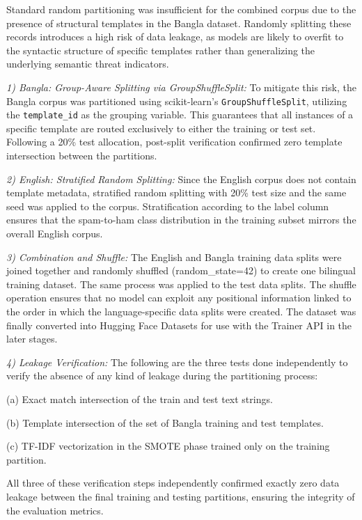 \documentclass[journal]{IEEEtran}
\begin{document}
Standard random partitioning was insufficient for the combined corpus due to the presence of structural templates in the Bangla dataset. Randomly splitting these records introduces a high risk of data leakage, as models are likely to overfit to the syntactic structure of specific templates rather than generalizing the underlying semantic threat indicators.

\textit{1) Bangla: Group-Aware Splitting via GroupShuffleSplit:} To mitigate this risk, the Bangla corpus was partitioned using scikit-learn's \texttt{GroupShuffleSplit}, utilizing the \texttt{template\_id} as the grouping variable. This guarantees that all instances of a specific template are routed exclusively to either the training or test set. Following a 20\% test allocation, post-split verification confirmed zero template intersection between the partitions.

\textit{2) English: Stratified Random Splitting:} Since the English corpus
does not contain template metadata, stratified random splitting with 20\%
test size and the same seed was applied to the corpus. Stratification
according to the label column ensures that the spam-to-ham class distribution in the training subset mirrors the overall English corpus.

\textit{3) Combination and Shuffle:} The English and Bangla training data
splits were joined together and randomly shuffled (random\_state=42) to
create one bilingual training dataset. The same process was applied to
the test data splits. The shuffle operation ensures that no model can
exploit any positional information linked to the order in
which the language-specific data splits were created. The dataset was
finally converted into Hugging Face Datasets for use with the Trainer
API in the later stages.

\textit{4) Leakage Verification:} The following are the three tests done
independently to verify the absence of any kind of leakage during the
partitioning process:

(a) Exact match intersection of the train and test text strings.

(b) Template intersection of the set of Bangla training and test
templates.

(c) TF-IDF vectorization in the SMOTE phase trained only on the
training partition.

All three of these verification steps independently confirmed exactly zero data leakage between the final training and testing partitions, ensuring the integrity of the evaluation metrics.
\end{document}
